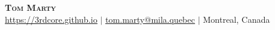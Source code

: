 \documentclass[letterpaper,11pt]{article}
\begin{document}

\begin{center}
    \textbf{\Huge \scshape Tom Marty} \\ \vspace{1pt}
        \href{https://3rdcore.github.io/}{\underline{https://3rdcore.github.io}}  $|$     \href{mailto:x@x.com}{\underline{tom.marty@mila.quebec}} $|$ 
    Montreal, Canada
    
\end{center}


\end{document}
